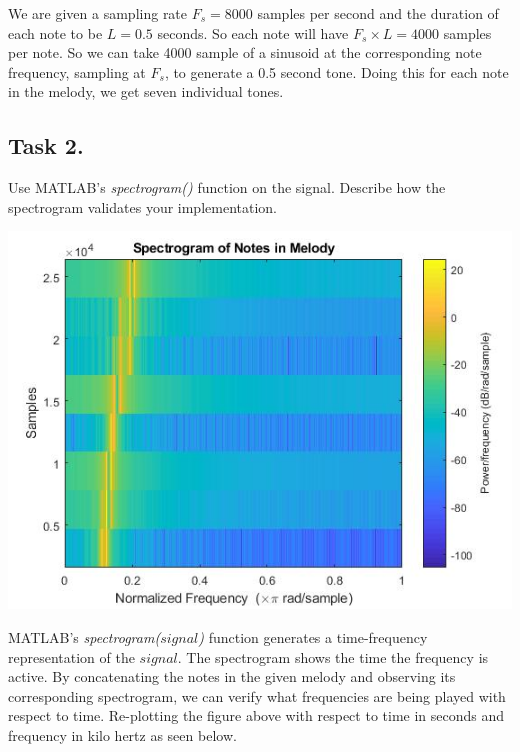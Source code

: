 \documentclass{article}
\begin{document}
        \indent We are given a sampling rate $F_s=8000$ samples per second and the duration of each note to be $L=0.5$ seconds. So each note will have $F_s\times L=4000$ samples per note. So we can take 4000 sample of a sinusoid at the corresponding note frequency, sampling at $F_s$, to generate a 0.5 second tone. Doing this for each note in the melody, we get seven individual tones.
        \pagebreak
        
    \subsection{Task 2.} Use MATLAB's \textit{spectrogram()} function on the signal. Describe how the spectrogram  validates your implementation.\\
        
        \begin{center}
            \includegraphics[width=\textwidth]{task2.jpg}
        \end{center}
        MATLAB's \textit{spectrogram($signal$)} function generates a time-frequency representation of the $signal$. The spectrogram shows the time the frequency is active. By concatenating the notes in the given melody and observing its corresponding spectrogram, we can verify what frequencies are being played with respect to time. Re-plotting the figure above with respect to time in seconds and frequency in kilo hertz as seen below.
\end{document}
